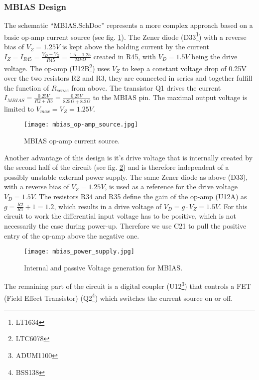 \subsubsection{MBIAS Design}
\label{sec:mbias_design}
The schematic ``MBIAS.SchDoc'' represents a more complex approach based on a basic op-amp current source (see fig. \ref{fig:mbias_op-amp_source}).
The Zener diode (D33\footnote{LT1634}) with a reverse bias of $V_Z = 1.25V$ is kept above the holding current by the current $I_Z = I_{R45} = \frac{V_D-V_Z}{R45} = \frac{1.5-1.25}{24k\Omega}$ created in R45, with $V_D = 1.5V$ being the drive voltage.
The op-amp (U12B\footnote{LTC6078}) uses $V_Z$ to keep a constant voltage drop of 0.25V over the two resistors R2 and R3, they are connected in series and together fulfill the function of $R_{sense}$ from above.
The transistor Q1 drives the current $I_{MBIAS} = \frac{0.25V}{R2+R3} = \frac{0.25V}{825\Omega+8.2\Omega}$ to the MBIAS pin.
The maximal output voltage is limited to $V_{max} = V_Z = 1.25V$.
\begin{figure}[H]
    \centering
    \texttt{[image: mbias\_op-amp\_source.jpg]}
    \caption[MBIAS Op-amp Current Source]{MBIAS op-amp current source.}
    \label{fig:mbias_op-amp_source}
\end{figure}

Another advantage of this design is it's drive voltage that is internally created by the second half of the circuit (see fig. \ref{fig:mbias_power_supply}) and is therefore independent of a possibly unstable external power supply.
The same Zener diode as above (D33), with a reverse bias of $V_Z = 1.25V$, is used as a reference for the drive voltage $V_D = 1.5V$.
The resistors R34 and R35 define the gain of the op-amp (U12A) as $g = \frac{R2}{R1}+1 = 1.2$, which results in a drive voltage of $V_D = g\cdot V_Z = 1.5V$.
For this circuit to work the differential input voltage has to be positive, which is not necessarily the case during power-up.
Therefore we use C21 to pull the positive entry of the op-amp above the negative one.
\begin{figure}[H]
    \centering
    \texttt{[image: mbias\_power\_supply.jpg]}
    \caption[MBIAS Voltage Generation]{Internal and passive Voltage generation for MBIAS.}
    \label{fig:mbias_power_supply}
\end{figure}

The remaining part of the circuit is a digital coupler (U12\footnote{ADUM1100}) that controls a FET (Field Effect Transistor) (Q2\footnote{BSS138}) which switches the current source on or off.

